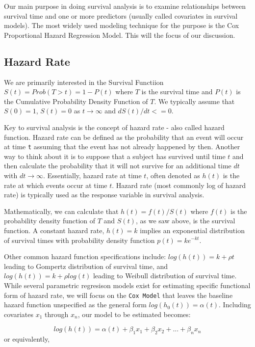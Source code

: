 \documentclass[11pt, letterpaper, twoside]{memoir}\usepackage{knitr}
\begin{document}
Our main purpose in doing survival analysis is to examine relationships between survival time and one or more predictors (usually called covariates in survival models). The most widely used modeling technique for the purpose is the Cox Proportional Hazard Regression Model. This will the focus of our discussion. 

\subsection{Hazard Rate}

We are primarily interested in the Survival Functiion $S(t) = Prob(T > t) = 1 - P(t)$ where $T$ is the survival time and $P(t)$ is the Cumulative Probability Density Function of $T$. We typically assume that $S(0) = 1$, $S(t) = 0$ as $t \rightarrow \infty $ and ${d S(t)}/{dt} <= 0$. 

Key to survival analysis is the concept of hazard rate - also called hazard function. Hazard rate can be defined as the probability that an event will occur at time \texttt{t} assuming that the event has not already happened by then. Another way to think about it is to suppose that a subject has survived until time $t$ and then calculate the probability that it will not survive for an additional time $dt$ with $dt \rightarrow \infty$. Essentially, hazard rate at time $t$, often denoted as $h(t)$ is the rate at which events occur at time $t$. Hazard rate (most commonly log of hazard rate) is typically used as the response variable in survival analysis. 

Mathematically, we can calculate that $h(t) = f(t) / S(t)$ where $f(t)$ is the probability density function of $T$ and $S(t)$, as we saw above, is the survival function. A constant hazard rate, $h(t) = k$ implies an exponential distribution of survival times with probability density function $p(t) = k e^{-kt}$. 

Other common hazard function specifications include: $log(h(t)) = k + \rho t $ leading to Gompertz distribution of survival time, and $log(h(t)) = k + \rho log(t)$ leading to Weibull distribution of survival time. While several parametric regresison models exist for estimating specific functional form of hazard rate, we will focus on the \texttt{Cox Model} that leaves the baseline hazard function unspecified as the general form $log(h_0(t)) = \alpha(t)$. Including covariates $x_1$ through $x_n$, our model to be estimated becomes:

$$log(h(t)) = \alpha(t) + \beta_1 x_1 + \beta_2 x_2 + ... + \beta_n x_n$$ or equivalently,
\end{document}
